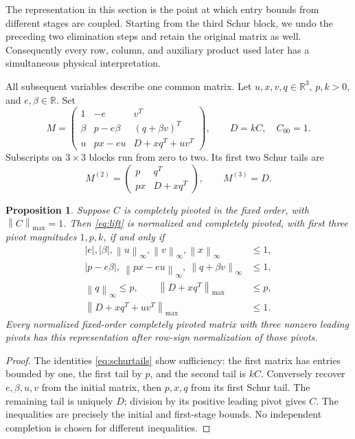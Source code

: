 \documentclass[11pt,reqno]{amsart}
\newtheorem{proposition}[theorem]{Proposition}
\theoremstyle{definition}
\theoremstyle{remark}
\newcommand{\R}{\mathbb R}
\newcommand{\mx}[1]{\left\|#1\right\|_{\max}}
\newcommand{\iin}[1]{\left\|#1\right\|_\infty}
\begin{document}
The representation in this section is the point at which entry bounds
from different stages are coupled. Starting from the third Schur block,
we undo the preceding two elimination steps and retain the original
matrix as well. Consequently every row, column, and auxiliary product
used later has a simultaneous physical interpretation.

All subsequent variables describe one common matrix. Let
\(u,x,v,q\in\R^3\), \(p,k>0\), and \(e,\beta\in\R\).
Set
\begin{equation}\label{eq:lift}
M=
\begin{pmatrix}
1&-e&v^T\\
\beta&p-e\beta&(q+\beta v)^T\\
u&px-eu&D+xq^T+uv^T
\end{pmatrix},\qquad D=kC,\quad C_{00}=1.
\end{equation}
Subscripts on \(3\times3\) blocks run from zero to two.
Its first two Schur tails are
\begin{equation}\label{eq:schurtails}
M^{(2)}=
\begin{pmatrix}p&q^T\\px&D+xq^T\end{pmatrix},
\qquad M^{(3)}=D.
\end{equation}

\begin{proposition}\label{prop:lift}
Suppose \(C\) is completely pivoted in the fixed order, with
\(\mx C=1\). Then \eqref{eq:lift} is normalized and completely pivoted,
with first three pivot magnitudes \(1,p,k\), if and only if
\begin{align}
|e|,|\beta|,\iin u,\iin v,\iin x&\le1,\label{eq:bands1}\\
|p-e\beta|,\ \iin{px-eu},\ \iin{q+\beta v}&\le1,\label{eq:bands2}\\
\iin q\le p,\qquad \mx{D+xq^T}&\le p,\label{eq:bands3}\\
\mx{D+xq^T+uv^T}&\le1.\label{eq:bands4}
\end{align}
Every normalized fixed-order completely pivoted matrix with three
nonzero leading pivots has this representation after row-sign
normalization of those pivots.
\end{proposition}

\begin{proof}
The identities \eqref{eq:schurtails} show sufficiency: the first matrix
has entries bounded by one, the first tail by \(p\), and the second tail
is \(kC\). Conversely recover \(e,\beta,u,v\) from the initial matrix,
then \(p,x,q\) from its first Schur tail. The remaining tail is uniquely
\(D\); division by its positive leading pivot gives \(C\).
The inequalities are precisely the initial and first-stage bounds.
No independent completion is chosen for different inequalities.
\end{proof}
\end{document}
